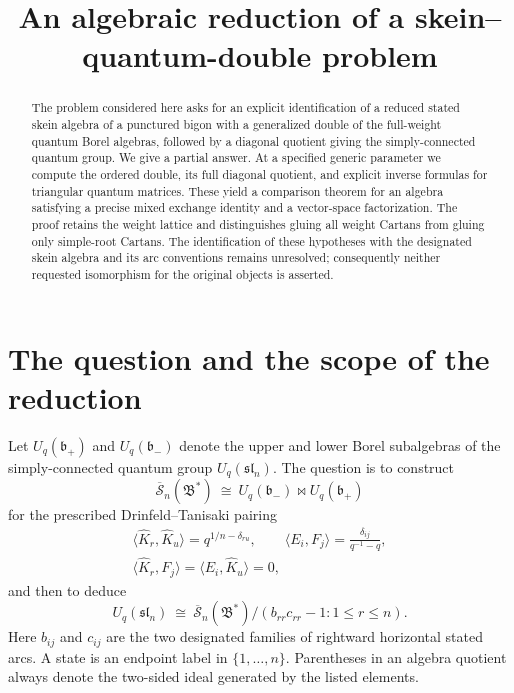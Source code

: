 \documentclass[11pt]{article}
\title{An algebraic reduction of a skein--quantum-double problem}
\author{}
\date{}
\theoremstyle{definition}
\theoremstyle{remark}
\newcommand{\cS}{\overline{\mathscr{S}}}
\begin{document}
\maketitle
\begin{abstract}
The problem considered here asks for an explicit identification of a reduced stated skein algebra of a punctured bigon with a generalized double of the full-weight quantum Borel algebras, followed by a diagonal quotient giving the simply-connected quantum group. We give a partial answer. At a specified generic parameter we compute the ordered double, its full diagonal quotient, and explicit inverse formulas for triangular quantum matrices. These yield a comparison theorem for an algebra satisfying a precise mixed exchange identity and a vector-space factorization. The proof retains the weight lattice and distinguishes gluing all weight Cartans from gluing only simple-root Cartans. The identification of these hypotheses with the designated skein algebra and its arc conventions remains unresolved; consequently neither requested isomorphism for the original objects is asserted.
\end{abstract}

\section{The question and the scope of the reduction}

Let $U_q(\mathfrak b_+)$ and $U_q(\mathfrak b_-)$ denote the upper and lower Borel subalgebras of the simply-connected quantum group $U_q(\mathfrak{sl}_n)$. The question is to construct
\begin{equation}\label{eq:question}
 \cS_n(\mathfrak B^*)\ \cong\ U_q(\mathfrak b_-)\bowtie U_q(\mathfrak b_+)
\end{equation}
for the prescribed Drinfeld--Tanisaki pairing
\begin{equation}\label{eq:requested-pairing}
 \begin{gathered}
 \langle\hat K_r,\hat K_u\rangle=q^{1/n-\delta_{ru}},\qquad
 \langle E_i,F_j\rangle=\frac{\delta_{ij}}{q^{-1}-q},\\
 \langle\hat K_r,F_j\rangle=\langle E_i,\hat K_u\rangle=0,
 \end{gathered}
\end{equation}
and then to deduce
\begin{equation}\label{eq:question-quotient}
 U_q(\mathfrak{sl}_n)\ \cong\ \cS_n(\mathfrak B^*)/
 (b_{rr}c_{rr}-1:1\leq r\leq n).
\end{equation}
Here $b_{ij}$ and $c_{ij}$ are the two designated families of rightward horizontal stated arcs. A state is an endpoint label in $\{1,\ldots,n\}$. Parentheses in an algebra quotient always denote the two-sided ideal generated by the listed elements.
\end{document}
